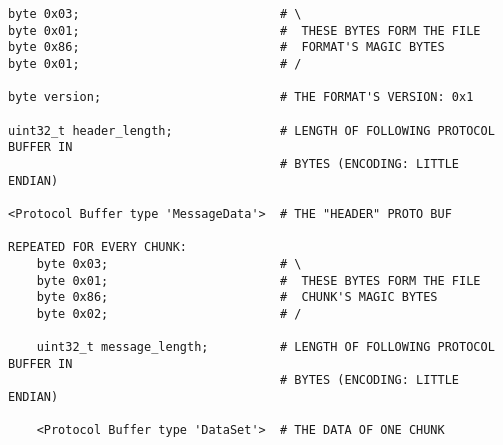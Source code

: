 \begin{Verbatim}[baselinestretch=1,fontsize=\scriptsize]
byte 0x03;                            # \
byte 0x01;                            #  THESE BYTES FORM THE FILE
byte 0x86;                            #  FORMAT'S MAGIC BYTES
byte 0x01;                            # /

byte version;                         # THE FORMAT'S VERSION: 0x1

uint32_t header_length;               # LENGTH OF FOLLOWING PROTOCOL BUFFER IN
                                      # BYTES (ENCODING: LITTLE ENDIAN)

<Protocol Buffer type 'MessageData'>  # THE "HEADER" PROTO BUF

REPEATED FOR EVERY CHUNK:
    byte 0x03;                        # \
    byte 0x01;                        #  THESE BYTES FORM THE FILE
    byte 0x86;                        #  CHUNK'S MAGIC BYTES
    byte 0x02;                        # /

    uint32_t message_length;          # LENGTH OF FOLLOWING PROTOCOL BUFFER IN
                                      # BYTES (ENCODING: LITTLE ENDIAN)

    <Protocol Buffer type 'DataSet'>  # THE DATA OF ONE CHUNK
\end{Verbatim}
